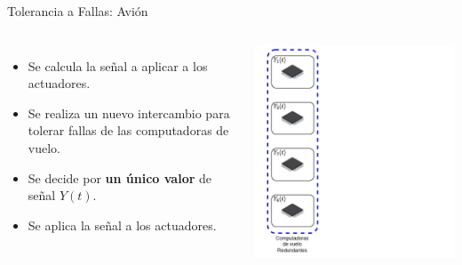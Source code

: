 \begin{frame}{Tolerancia a Fallas: Avión}
	\begin{columns}
			\begin{itemize}
				\item <2->Se calcula la señal a aplicar a los actuadores.
				\item <3->Se realiza un nuevo intercambio para tolerar fallas de las computadoras de vuelo.
				\item <4->Se decide por \textbf{un único valor} de señal $Y(t)$.
				\item <5->Se aplica la señal a los actuadores.
			\end{itemize}
			\begin{overprint}
				\includegraphics[width=\textwidth]{img/calculo_actuacion_1.png}

\end{overprint}
\end{columns}
\end{frame}
